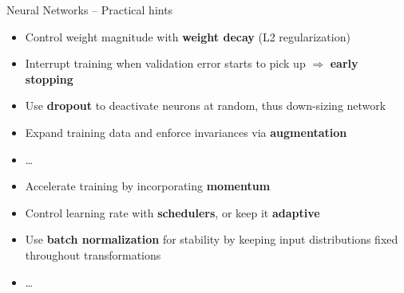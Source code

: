 \begin{frame}{Neural Networks -- Practical hints}

\begin{itemize}
  \item Control weight magnitude with \textbf{weight decay} (L2 
  regularization)
  \item Interrupt training when validation error starts to pick up 
  $\Rightarrow$ \textbf{early stopping}
  \item Use \textbf{dropout} to deactivate neurons at random, thus down-sizing 
  network
  \item Expand training data and enforce invariances via \textbf{augmentation}
  \item \dots
\end{itemize}

\begin{itemize}
  \item Accelerate training by incorporating \textbf{momentum}
  \item Control learning rate with \textbf{schedulers}, or keep it 
  \textbf{adaptive}
  \item Use \textbf{batch normalization} for stability by keeping 
  input distributions fixed throughout transformations
  \item \dots
\end{itemize}

% 
% 
% 
% 
% 


\end{frame}
